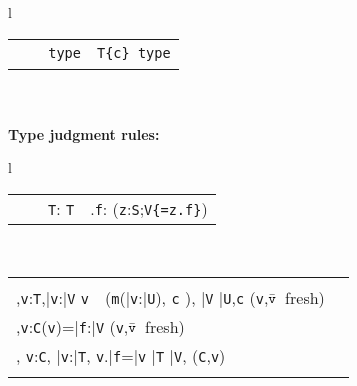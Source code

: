 \begin{figure*}
\begin{tabular}{l}
{\begin{tabular}{p{}p{}p{}}
\infrule[Class]
	{\Gamma \vdash \klass({\tt C})}
	{\Gamma \vdash {\tt C}\ \type} 
&
\infrule[Exist-T]
	{\Gamma\tt \vdash {\tt S}\ \type, {\tt T}\ \type}
	{\Gamma\tt \vdash {\tt x:S;T}\ {\tt type}} 
&
\infrule[Dep]
	{\Gamma\tt \vdash T\ \type \andalso \Gamma, \self:T \vdash c:o}
	{\Gamma\tt \vdash T\{c\}\ {\tt type}} 
\\
\end{tabular}}
\quad\\
\quad\\
{\bf Type judgment rules:}\\
{\tabcolsep=0pt
\begin{tabular}{l}
\begin{tabular}{p{}p{}p{}}
\infax[T-Var]
      {\Gamma, {\tt x}:{\tt T} \vdash {\tt x}:{\tt T\{\self==x\}}}
&
\infrule[T-Cast]
	{\Gamma \vdash {\tt e}:{\tt U} \andalso \Gamma \vdash {\tt T} \ \type}
	{\Gamma \vdash {\tt e}\ \as\ {\tt T}: {\tt T}} &
\infrule[T-Field]
	{\Gamma \vdash {\tt e}: {\tt S} \andalso \Gamma,{\tt z}:{\tt S}\vdash {\tt z}\ \has\ {\tt f}:{\tt V} \andalso \mbox{({\tt z} fresh)} }
	{\Gamma \vdash {\tt e}.{\tt f}:  ({\tt z}:{\tt S};{\tt V\{\self=z.f\}})}
\end{tabular}\\
\begin{tabular}{p{}p{}} 
\infrule[T-Invk]
	{\Gamma \vdash {\tt e}:{\tt T},\bar{\tt e}:\bar{\tt V} \andalso \\
	  \Gamma,{\tt v}:{\tt T},\bar{\tt v}:\bar{\tt V} \vdash
		{\tt v}\ \has\ ({\tt m}(\bar{\tt v}:\bar{\tt U}), {\tt c} \rightarrow {\tt S}), 
		\bar{\tt V} \subtype \bar{\tt U},{\tt c} 
	  \andalso \mbox{({\tt v},$\bar{\tt v}$ fresh)}}
	{\Gamma \vdash {\tt e}.{\tt m}(\bar{\tt e}): ({\tt v}:{\tt T};\bar{\tt v}:\bar{\tt V};S)}
	&
\infrule[T-New]
	{\Gamma \vdash \bar{\tt e}:\bar{\tt T} \andalso \vdash \klass({\tt C}) \\ 
	  \Gamma,{\tt v}:{\tt C}\vdash \fields({\tt v})=\bar{\tt f}:\bar{\tt V}  \andalso \mbox{({\tt v},$\bar{\tt v}$\ fresh)}\\
	  \Gamma, {\tt v}:{\tt C}, \bar{\tt v}:\bar{\tt T}, {\tt v}.\bar{\tt f}=\bar{\tt v} 
	  \vdash \bar{\tt T} \subtype \bar{\tt V}, \inv({\tt C},{\tt v})}
	{\Gamma \vdash \new\ {\tt C}(\bar{\tt e}): {\tt C}\{\bar{\tt v}:\bar{\tt T}; \new\ {\tt C}(\bar{\tt v})=\self, \inv({\tt C},\self)\}}\\
\infrule[Method OK]
	{\this:{\tt C}\vdash {\tt c}:o \andalso \this:{\tt C},\bar{\tt x}:\bar{\tt V},{\tt c} \vdash {\tt T} \ \type, \bar{\tt V} \ \type, 
}
\end{tabular}
\end{tabular}}
\end{tabular}
\end{figure*}
